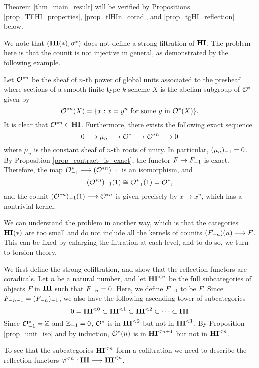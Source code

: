Theorem \ref{thm_main_result} will be verified by Propositions
\ref{prop_TFHI_properties}, \ref{prop_tlHIn_corad}, and 
\ref{prop_tgHI_reflection} below.

\begin{rmk}\label{rmk_sgHI_is_not_strong_filt}
We note that $(\HI(*), \sgHI{*})$ does not define a strong 
filtration of $\HI$. The problem here is that the counit is not 
injective in general, as demonstrated by the following example.

Let $\Oxn$ be the sheaf of $n$-th power of global units 
associated to the presheaf where sections of a smooth finite type 
$k$-scheme $X$ is the abelian subgroup of $\Ox$ given by 
\[
\Oxn(X) = \{x : x=y^n\textrm{ for some }y \textrm{ in } \Ox(X)\}.
\]
It is clear that $\Oxn \in \HI$. Furthermore, there exists the 
following exact sequence 
\[
0 \to \mu_n \to \Ox \to \Oxn \to 0
\]
where $\mu_n$ is the constant sheaf of $n$-th roots of unity.
In particular, $\RHI{(\mu_n)} = 0$. By Proposition 
\ref{prop_contract_is_exact}, the functor $F \mapsto \RHI{F}$ is
exact. Therefore, the map $\RHI{\Ox} \to \RHI{(\Oxn)}$ is an
isomorphism, and
\[
\LHI{\RHI{(\Oxn)}} \cong \LHI{\RHI{\Ox}} = \Ox,
\]
and the counit $\LHI{\RHI{(\Oxn)}} \to \Oxn$ is given precisely by
$x \mapsto x^n$, which has a nontrivial kernel.

We can understand the problem in another way, which is that the 
categories $\HI(*)$ are too small and do not include all
the kernels of counits $\LHI[n]{(\RHI[n]{F})} \to F$. This can be 
fixed by enlarging the filtration at each level, and to do so, we 
turn to torsion theory.
\end{rmk}

We first define the strong cofiltration, and show that the 
reflection functors are coradicals. Let $n$ be a natural number, 
and let $\TLHI{n}{\HI}$ be the full subcategories of objects $F$ 
in $\HI$ such that $\RHI[n]{F} = 0$. Here, we define $\RHI[0]{F}$
to be $F$. Since $\RHI[n - 1]{F} = \RHI{(\RHI[n]{F})}$, we also 
have the following ascending tower of subcategories
\[
0 = \TLHI{0}{\HI} \subset \TLHI{1}{\HI} \subset \TLHI{2}{\HI} 
   \subset \cdots \subset \HI
\]
Since $\RHI{\Ox} = \Z$ and $\RHI{\Z} = 0$, $\Ox$ is in 
$\TLHI{2}{\HI}$ but not in $\TLHI{1}{\HI}$. By Proposition 
\ref{prop_unit_iso} and by induction, $\LHI[n]{\Ox}$ is in 
$\TLHI{n + 1}{\HI}$ but not in $\TLHI{n}{\HI}$.

To see that the subcategories $\TLHI{n}{\HI}$ form a cofiltration
we need to describe the reflection functors $\tlHI{n} : \HI \to 
\TLHI{n}{\HI}$. 

